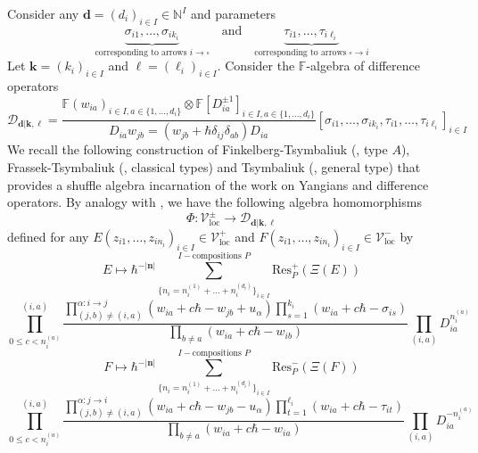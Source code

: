\documentclass{amsart}
\def\BF{{\mathbb{F}}}
\def\DD{{\mathcal{D}}}
\def\CV{{\mathcal{V}}}
\def\bd{{\mathbf{d}}}
\def\bk{{\mathbf{k}}}
\def\bell{\boldsymbol{\ell}}
\def\nn{{\mathbb{N}^I}}
\def\bn{{\boldsymbol{n}}}
\def\field{\BF}
\def\Ts{\Phi}
\begin{document}
Consider any $\bd = (d_i)_{i \in I} \in \nn$ and parameters
\begin{equation}
\label{eqn:framing}
\underbrace{\sigma_{i1},\dots,\sigma_{ik_i}}_{\text{corresponding to arrows }i \rightarrow \square} \quad \text{and} \quad \underbrace{\tau_{i1},\dots,\tau_{i\ell_i}}_{\text{corresponding to arrows } \square \rightarrow i}
\end{equation}
Let $\bk = (k_i)_{i \in I}$ and $\bell = (\ell_i)_{i \in I}$. Consider the $\field$-algebra of difference operators
\begin{equation}
\label{eqn:difference operators}
\DD_{\bd|\bk,\bell} = \frac {\field(w_{ia})_{i \in I, a \in \{1,\dots,d_i\}} \otimes \field[D^{\pm 1}_{ia}]_{i \in I, a \in \{1,\dots,d_i\}}}{D_{ia} w_{jb} = (w_{jb}+\hbar\delta_{ij}\delta_{ab})D_{ia}}[\sigma_{i1},\dots,\sigma_{ik_i}, \tau_{i1},\dots,\tau_{i\ell_i}]_{i \in I}
\end{equation}
We recall the following construction of Finkelberg-Tsymbaliuk (\cite{FT}, type $A$), Frassek-Tsymbaliuk (\cite{FrT}, classical types) and Tsymbaliuk (\cite{Tsymbaliuk}, general type) that provides a shuffle algebra incarnation of the work \cite{GKLO} on Yangians and difference operators. By analogy with \cite[Theorem B.17]{FrT}, we have the following algebra homomorphisms
\begin{equation}
\label{eqn:tsymbaliuk}
\Ts : \CV^\pm_{\text{loc}} \rightarrow \DD_{\bd|\bk,\bell}
\end{equation}
defined for any $E(z_{i1},\dots,z_{in_i})_{i \in I} \in \CV^+_{\text{loc}}$ and $F(z_{i1},\dots,z_{in_i})_{i \in I} \in \CV^-_{\text{loc}}$ by
\begin{equation}
\label{eqn:action e}
E \mapsto \hbar^{-|\bn|} \sum^{I-\text{compositions }P}_{\{n_i = n_i^{(1)}+ \dots + n_i^{(d_i)}\}_{i \in I}} \text{Res}^+_P(\Xi(E))
\end{equation} 
$$
\prod^{(i,a)}_{0 \leq c < n_i^{(a)}} 
\frac {\prod^{\alpha : i \rightarrow j}_{(j,b) \neq (i,a)} (w_{ia} + c \hbar - w_{jb} + u_\alpha ) \prod_{s=1}^{k_i} (w_{ia} + c \hbar - \sigma_{is})}{\prod_{b \neq a} (w_{ia} + c \hbar - w_{ib})} \prod_{(i,a)} D_{ia}^{n_i^{(a)}}
$$
\begin{equation}
\label{eqn:action f}
F \mapsto \hbar^{-|\bn|} \sum^{I-\text{compositions }P}_{\{n_i = n_i^{(1)}+ \dots + n_i^{(d_i)}\}_{i \in I}} \text{Res}^-_P(\Xi(F))
\end{equation} 
$$
\prod^{(i,a)}_{0 \leq c < n_i^{(a)}} 
\frac {\prod^{\alpha : j \rightarrow i}_{(j,b) \neq (i,a)} (w_{ia} + c\hbar - w_{jb} - u_\alpha) \prod_{t=1}^{\ell_i} (w_{ia} + c\hbar - \tau_{it})}{\prod_{b \neq a} (w_{ia} + c\hbar - w_{ia})} \prod_{(i,a)} D_{ia}^{-n_i^{(a)}}
$$
\end{document}
